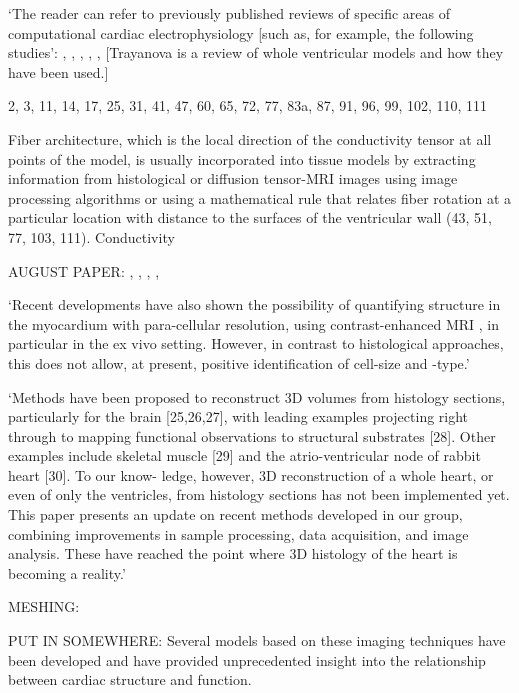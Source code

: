   `The reader can refer to previously published reviews of specific areas of computational cardiac electrophysiology [such as, for example, the following studies':  \cite{Brennan2009}, \cite{Clayton2011}, \cite{Greenstein2011}, \cite{Rudy2006}, \cite{Trayanova2011}, [Trayanova is a review of whole ventricular models and how they have been used.]
  
  2, 3, 11, 14, 17, 25, 31, 41, 47, 60, 65, 72, 77, 83a, 87, 91, 96, 99, 102, 110, 111
  
  Fiber architecture, which is the local direction of the conductivity tensor at all points of the model, is usually incorporated into tissue models by extracting information from histological or diffusion tensor-MRI images using image processing algorithms or using a mathematical rule that relates fiber rotation at a particular location with distance to the surfaces of the ventricular wall (43, 51, 77, 103, 111). Conductivity
  
  AUGUST PAPER:
  \cite{Kanai1995}, \cite{Vetter2005}, \cite{DeBakker2005}, \cite{Eason1998}, 
  
  `Recent developments have also shown the possibility of quantifying structure in the myocardium with para-cellular resolution, using contrast-enhanced MRI \cite{Gilbert2012}, in particular in the ex vivo setting. However, in contrast to histological approaches, this does not allow, at present, positive identification of cell-size and -type.'
  
  `Methods have been proposed to reconstruct 3D volumes from histology sections, particularly for the brain [25,26,27], with leading examples projecting right through to mapping functional observations to structural substrates [28]. Other examples include skeletal muscle [29] and the atrio-ventricular node of rabbit heart [30]. To our know- ledge, however, 3D reconstruction of a whole heart, or even of only the ventricles, from histology sections has not been implemented yet. This paper presents an update on recent methods developed in our group, combining improvements in sample processing, data acquisition, and image analysis. These have reached the point where 3D histology of the heart is becoming a reality.'
  
  MESHING: \cite{Prassl2009}

  PUT IN SOMEWHERE:
  Several models based on these imaging techniques have been developed and have provided unprecedented insight into the relationship between cardiac structure and function.

